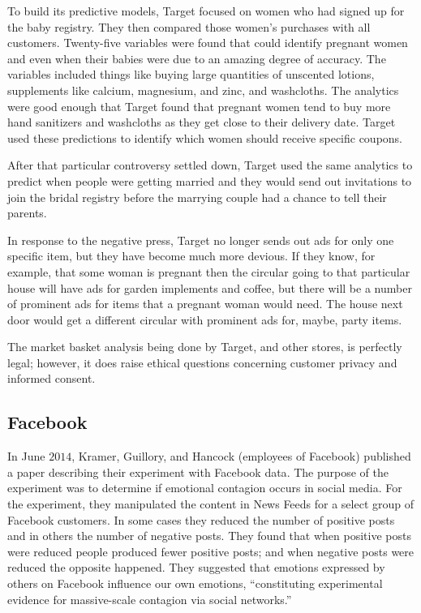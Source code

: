 To build its predictive models, Target focused on women who had signed up for the baby registry. They then compared those women’s purchases with all customers. Twenty-five variables were found that could identify pregnant women and even when their babies were due to an amazing degree of accuracy. The variables included things like buying large quantities of unscented lotions, supplements like calcium, magnesium, and zinc, and washcloths. The analytics were good enough that Target found that pregnant women tend to buy more hand sanitizers and washcloths as they get close to their delivery date. Target used these predictions to identify which women should receive specific coupons. 

After that particular controversy settled down, Target used the same analytics to predict when people were getting married and they would send out invitations to join the bridal registry before the marrying couple had a chance to tell their parents.

In response to the negative press, Target no longer sends out ads for only one specific item, but they have become much more devious. If they know, for example, that some woman is pregnant then the circular going to that particular house will have ads for garden implements and coffee, but there will be a number of prominent ads for items that a pregnant woman would need. The house next door would get a different circular with prominent ads for, maybe, party items.

The market basket analysis being done by Target, and other stores, is perfectly legal; however, it does raise ethical questions concerning customer privacy and informed consent. 

\subsection{Facebook}

In June $ 2014 $, Kramer, Guillory, and Hancock (employees of Facebook) published a paper describing their experiment with Facebook data\cite{kramer2014experimental}. The purpose of the experiment was to determine if emotional contagion occurs in social media. For the experiment, they manipulated the content in News Feeds for a select group of Facebook customers. In some cases they reduced the number of positive posts and in others the number of negative posts. They found that when positive posts were reduced people produced fewer positive posts; and when negative posts were reduced the opposite happened. They suggested that emotions expressed by others on Facebook influence our own emotions, ``constituting experimental evidence for massive-scale contagion via social networks.''

